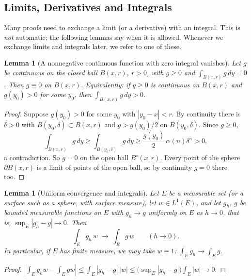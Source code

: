 \documentclass[11pt]{article}
\theoremstyle{plain}
\newtheorem{lemma}[theorem]{Lemma}
\theoremstyle{definition}
\theoremstyle{remark}
\begin{document}
\subsection{Limits, Derivatives and Integrals}\label{ssec:limits}
Many proofs need to exchange a limit (or a derivative) with an integral. This is \emph{not} automatic; the following lemmas say when it is allowed. Whenever we exchange limits and integrals later, we refer to one of these.

\begin{lemma}[A nonnegative continuous function with zero integral vanishes]\label{lem:zero}
Let $g$ be continuous on the closed ball $B(x,r)$, $r > 0$, with $g \geq 0$ and $\int_{B(x,r)} g\, dy = 0$. Then $g \equiv 0$ on $B(x,r)$. Equivalently: if $g \geq 0$ is continuous on $B(x,r)$ and $g(y_0) > 0$ for some $y_0$, then $\int_{B(x,r)} g\, dy > 0$.
\end{lemma}
\begin{proof}
Suppose $g(y_0) > 0$ for some $y_0$ with $|y_0 - x| < r$. By continuity there is $\delta > 0$ with $B(y_0,\delta) \subset B(x,r)$ and $g > g(y_0)/2$ on $B(y_0,\delta)$. Since $g \geq 0$,
$$ \int_{B(x,r)} g\, dy \geq \int_{B(y_0,\delta)} g\, dy \geq \frac{g(y_0)}{2}\, \alpha(n)\delta^n > 0, $$
a contradiction. So $g = 0$ on the open ball $B^\circ(x,r)$. Every point of the sphere $\partial B(x,r)$ is a limit of points of the open ball, so by continuity $g = 0$ there too.
\end{proof}

\begin{lemma}[Uniform convergence and integrals]\label{lem:uniform}
Let $E$ be a measurable set (or a surface such as a sphere, with surface measure), let $w \in L^1(E)$, and let $g_h$, $g$ be bounded measurable functions on $E$ with $g_h \to g$ \emph{uniformly} on $E$ as $h \to 0$, that is, $\sup_E |g_h - g| \to 0$. Then
$$ \int_E g_h\, w \;\longrightarrow\; \int_E g\, w \qquad (h \to 0). $$
In particular, if $E$ has finite measure, we may take $w \equiv 1$: $\int_E g_h \to \int_E g$.
\end{lemma}
\begin{proof}
$\displaystyle \left| \int_E g_h w - \int_E g w \right| \leq \int_E |g_h - g|\,|w| \leq \Big(\sup_E|g_h - g|\Big) \int_E |w| \to 0.$
\end{proof}
\end{document}
